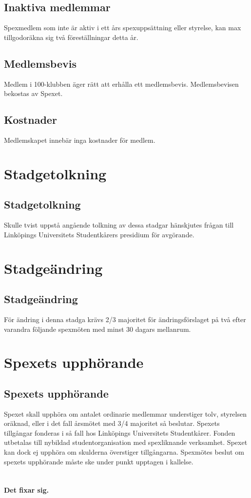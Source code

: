 \documentclass[a4paper]{article}
\begin{document}
\subsection{Inaktiva medlemmar}
Spexmedlem som inte är aktiv i ett års spexuppsättning eller styrelse, kan max tillgodoräkna sig två föreställningar detta år.

\subsection{Medlemsbevis}
Medlem i 100-klubben äger rätt att erhålla ett medlemsbevis. Medlemsbevisen bekostas av Spexet.

\subsection{Kostnader}
Medlemskapet innebär inga kostnader för medlem.

\section{Stadgetolkning}
\subsection{Stadgetolkning}
Skulle tvist uppstå angående tolkning av dessa stadgar hänskjutes frågan till Linköpings Universitets Studentkårers presidium för avgörande.

\section{Stadgeändring}
\subsection{Stadgeändring}
För ändring i denna stadga krävs 2/3 majoritet för ändringsförslaget på två efter varandra följande spexmöten med minst 30 dagars mellanrum.

\section{Spexets upphörande}
\subsection{Spexets upphörande}
Spexet skall upphöra om antalet ordinarie medlemmar understiger tolv, styrelsen oräknad, eller i det fall årsmötet med 3/4 majoritet så beslutar. Spexets tillgångar fonderas i så fall hos Linköpings Universitets Studentkårer. Fonden utbetalas till nybildad studentorganisation med spexliknande verksamhet. Spexet kan dock ej upphöra om skulderna överstiger tillgångarna. Spexmötes beslut om spexets upphörande måste ske under punkt upptagen i kallelse.

\setcounter{section}{16}
\section{ }
\textbf{Det fixar sig.}
\end{document}
